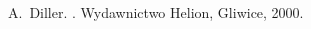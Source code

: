 
\begin{thebibliography}{1}

A.~Diller.
.
\newblock Wydawnictwo Helion, Gliwice, 2000.

\end{thebibliography}